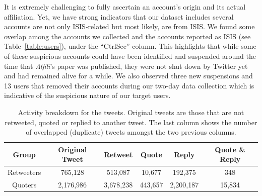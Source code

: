 \documentclass[letterpaper]{article} %
\begin{document}
It is extremely challenging to fully ascertain an account's origin and its actual affiliation. 
Yet, we have strong indicators that our dataset includes several  accounts are not only ISIS-related but most likely, are from ISIS. We found some overlap among the accounts we collected and the accounts reported as ISIS (see Table~\ref{table:users}), under the ``CtrlSec'' column. This highlights that while some of these suspicious accounts could have been identified and suspended around the time that \textit{Alfili}'s paper was published, they were not shut down by Twitter yet and had remained alive for a while. We also observed three new suspensions and 13 users that removed their accounts during our two-day data collection which is indicative of  the suspicious nature of our target users.


 

\begin{table}[!htbp]
\centering
\begin{tabular}{|c||c|c|c|c|c|} 
 \hline
 Group & Original Tweet & Retweet & Quote & Reply & Quote \& Reply \\ [0.5ex] 
 \hline\hline
  \rule{0pt}{1ex} Retweeters & 765,128 & 513,087 & 10,677 & 192,375 & 348\\\hline 
 Quoters & 2,176,986 & 3,678,238 & 443,657 & 2,200,187 & 15,834\\[0.25ex]\hline
\end{tabular}
\caption{Activity breakdown for the tweets. Original tweets are those that are not retweeted, quoted or replied to another tweet. The last column shows the number of overlapped (duplicate) tweets amongst the two previous columns.}
\label{table:activity-type}
\end{table}
\end{document}
